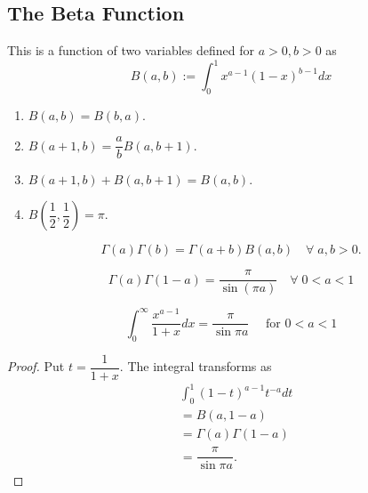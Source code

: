\subsection{The Beta Function}
\begin{defn}
	This is a function of two variables defined for $a > 0, b > 0$ as 
	\begin{equation*} 
		B(a, b) := \int_{0}^{1} x^{a-1}(1 - x)^{b-1} dx
	\end{equation*}
\end{defn}
\begin{mdframed}[style=boxstyle, frametitle={Some identities}]
	\begin{enumerate}[leftmargin=*]
		\item $B(a, b) = B(b, a).$
		\item $B(a + 1, b) = \dfrac{a}{b}B(a, b+1).$
		\item $B(a + 1, b) + B(a, b+1) = B(a, b).$
		\item $B\left(\dfrac{1}{2}, \dfrac{1}{2}\right) = \pi.$
	\end{enumerate}
\end{mdframed}
\begin{thm} 
	\begin{equation*} 
		\Gamma(a)\Gamma(b) = \Gamma(a + b)B(a, b) \quad \forall\; a, b > 0.
	\end{equation*}
\end{thm}
\begin{thm}
	\begin{equation*} 
		\Gamma(a)\Gamma(1 - a) = \dfrac{\pi}{\sin(\pi a)} \quad \forall\;0 < a < 1
	\end{equation*}
\end{thm}

\begin{mdframed}[style=boxstyle2, frametitle={An integral computation}]
	\begin{thm} \label{thm:randomintegral}
		\begin{equation*} 
			\int_{0}^{\infty} \dfrac{x^{a-1}}{1 + x} dx = \dfrac{\pi}{\sin \pi a} \quad \text{ for } 0 < a < 1
		\end{equation*}
	\end{thm}
	\begin{proof} 
		Put $t = \dfrac{1}{1 + x}.$ The integral transforms as
		\begin{align*} 
			& \int_{0}^{1} (1 - t)^{a - 1}t^{-a} dt\\
			& = B(a, 1 - a)\\
			& = \Gamma(a)\Gamma(1 - a)\\
			& = \dfrac{\pi}{\sin \pi a}.
		\end{align*}
	\end{proof}
\end{mdframed}

